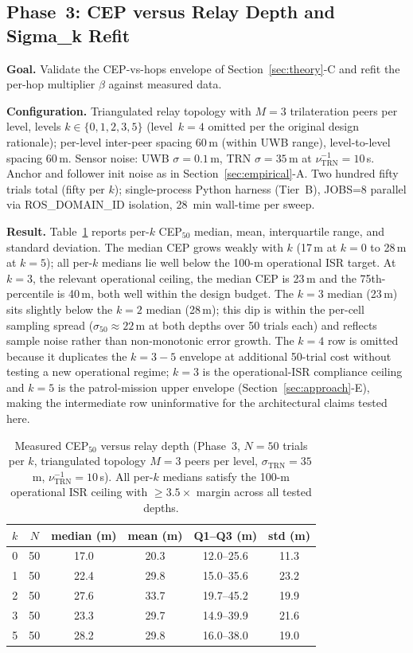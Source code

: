 \documentclass[journal,10pt,twocolumn]{IEEEtran}
\begin{document}
\subsection{Phase~3: CEP versus Relay Depth and Sigma\_k Refit}
\label{sec:phase3-cep}

\textbf{Goal.} Validate the CEP-vs-hops envelope of Section~\ref{sec:theory}-C and refit the per-hop multiplier $\beta$ against measured data.

\textbf{Configuration.} Triangulated relay topology with $M{=}3$ trilateration peers per level, levels $k\in\{0,1,2,3,5\}$ (level~$k=4$ omitted per the original design rationale); per-level inter-peer spacing 60\,m (within UWB range), level-to-level spacing 60\,m. Sensor noise: UWB $\sigma=0.1$\,m, TRN $\sigma=35$\,m at $\nu_\text{TRN}^{-1}=10$\,s. Anchor and follower init noise as in Section~\ref{sec:empirical}-A. Two hundred fifty trials total (fifty per $k$); single-process Python harness (Tier~B), JOBS=8 parallel via ROS\_DOMAIN\_ID isolation, 28~min wall-time per sweep.

\textbf{Result.} Table~\ref{tab:cep_measured} reports per-$k$ CEP$_{50}$ median, mean, interquartile range, and standard deviation. The median CEP grows weakly with $k$ (17\,m at $k=0$ to 28\,m at $k=5$); all per-$k$ medians lie well below the 100-m operational ISR target. At $k{=}3$, the relevant operational ceiling, the median CEP is 23\,m and the 75th-percentile is 40\,m, both well within the design budget. The $k{=}3$ median (23\,m) sits slightly below the $k{=}2$ median (28\,m); this dip is within the per-cell sampling spread ($\sigma_{50} \approx 22$\,m at both depths over 50 trials each) and reflects sample noise rather than non-monotonic error growth. The $k{=}4$ row is omitted because it duplicates the $k{=}3{-}5$ envelope at additional 50-trial cost without testing a new operational regime; $k=3$ is the operational-ISR compliance ceiling and $k=5$ is the patrol-mission upper envelope (Section~\ref{sec:approach}-E), making the intermediate row uninformative for the architectural claims tested here.

\begin{table}[t]
\centering
\caption{Measured CEP$_{50}$ versus relay depth (Phase~3, $N{=}50$ trials per $k$, triangulated topology $M{=}3$ peers per level, $\sigma_\text{TRN}=35$\,m, $\nu_\text{TRN}^{-1}=10$\,s). All per-$k$ medians satisfy the 100-m operational ISR ceiling with $\geq 3.5\times$ margin across all tested depths.}
\label{tab:cep_measured}
\small
\begin{tabular}{@{}cccccc@{}}
\toprule
$k$ & $N$ & median (m) & mean (m) & Q1--Q3 (m) & std (m) \\
\midrule
0 & 50 & 17.0 & 20.3 & 12.0--25.6 & 11.3 \\
1 & 50 & 22.4 & 29.8 & 15.0--35.6 & 23.2 \\
2 & 50 & 27.6 & 33.7 & 19.7--45.2 & 19.9 \\
3 & 50 & 23.3 & 29.7 & 14.9--39.9 & 21.6 \\
5 & 50 & 28.2 & 29.8 & 16.0--38.0 & 19.0 \\
\bottomrule
\end{tabular}
\end{table}
\end{document}
